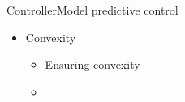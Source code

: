 \begin{frame}{Controller}{Model predictive control}
\begin{itemize}
	\item<1-> Convexity 
	 	\begin{itemize}
	 	\item<1-> Ensuring convexity 
	 	\item<1-> 
	 	\end{itemize}
\end{itemize}
\end{frame}